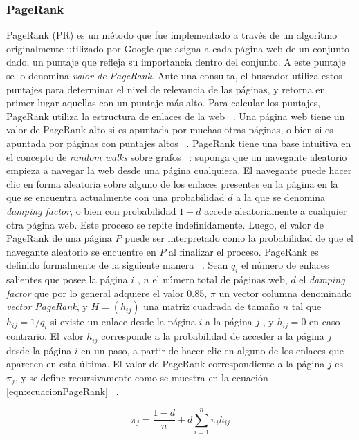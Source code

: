\subsubsection{PageRank}
PageRank (PR) es un método que fue implementado a través de un algoritmo
originalmente utilizado por Google que asigna a cada página web de un conjunto dado, un puntaje que refleja su importancia dentro del conjunto. A este puntaje se lo denomina \textit{valor de PageRank}. Ante una consulta, el buscador utiliza estos puntajes para determinar el nivel de relevancia de las páginas, y retorna en primer lugar aquellas con un puntaje más alto. Para calcular los puntajes, PageRank utiliza la estructura de enlaces de la web ~\cite{brin1998anatomy}. Una página web tiene un valor de PageRank alto si es apuntada por muchas otras páginas, o bien si es apuntada por páginas con puntajes altos ~\cite{page1999pagerank}. PageRank tiene una base intuitiva en el concepto de \textit{random walks} sobre grafos ~\cite{gobel1974random}: suponga que un navegante aleatorio empieza a navegar la web desde una página cualquiera. El navegante puede hacer clic en forma aleatoria sobre alguno de los enlaces presentes en la página en la que se encuentra actualmente con una probabilidad $d$ a la que se denomina \textit{damping factor}, o bien con probabilidad $1-d$ accede aleatoriamente a cualquier otra página web. Este proceso se repite indefinidamente. Luego, el valor de PageRank de una página $P$ puede ser interpretado como la probabilidad de que el navegante aleatorio se encuentre en $P$ al finalizar el proceso. PageRank es definido formalmente de la siguiente manera ~\cite{franceschet2011pagerank}. Sean $q_i$ el número de enlaces salientes que posee la página $i$ , $n$ el número total de páginas web, $d$ el \textit{damping factor} que por lo general adquiere el valor 0.85, $\pi$ un vector columna denominado \textit{vector PageRank}, y $H = (h_{ij})$ una matriz cuadrada de tamaño $n$ tal que $h_{ij} = 1/q_i$ si existe un enlace desde la página $i$ a la página $j$ , y $h_{ij} = 0$ en caso contrario. El valor $h_{ij}$ corresponde a la probabilidad de acceder a la página $j$ desde la página $i$ en un paso, a partir de hacer clic en alguno de los enlaces que aparecen en esta última. El valor de PageRank correspondiente a la página $j$ es $\pi_j$, y se define recursivamente como se muestra en la ecuación \ref{eqn:ecuacionPageRank} ~\cite{lin2010data}.

\begin{equation} 
	\label{eqn:ecuacionPageRank} 
	\pi_j = \frac{1-d}{n} + d \sum_{i=1}^{n} \pi_i h_{ij} 
\end{equation}

